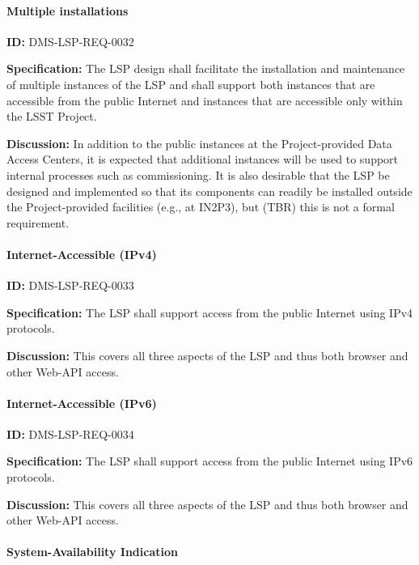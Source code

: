 \documentclass[SE,toc]{lsstdoc}
\begin{document}
\paragraph{Multiple installations}\hfill  %

\label{DMS-LSP-REQ-0032}
\textbf{ID:} DMS-LSP-REQ-0032

\textbf{Specification:}
The LSP design shall facilitate the installation and maintenance of multiple instances of the LSP and shall support both instances that are accessible from the public Internet and instances that are accessible only within the LSST Project.

\textbf{Discussion:}
In addition to the public instances at the Project-provided Data Access Centers, it is expected that additional instances will be used to support internal processes such as commissioning.
It is also desirable that the LSP be designed and implemented so that its components can readily be installed outside the Project-provided facilities (e.g., at IN2P3), but (TBR) this is not a formal requirement.

\paragraph{Internet-Accessible (IPv4)}\hfill  %

\label{DMS-LSP-REQ-0033}
\textbf{ID:} DMS-LSP-REQ-0033

\textbf{Specification:}
The LSP shall support access from the public Internet using IPv4 protocols.

\textbf{Discussion:}
This covers all three aspects of the LSP and thus both browser and other Web-API access.

\paragraph{Internet-Accessible (IPv6)}\hfill  %

\label{DMS-LSP-REQ-0034}
\textbf{ID:} DMS-LSP-REQ-0034

\textbf{Specification:}
The LSP shall support access from the public Internet using IPv6 protocols.

\textbf{Discussion:}
This covers all three aspects of the LSP and thus both browser and other Web-API access.

\paragraph{System-Availability Indication}\hfill  %
\end{document}
